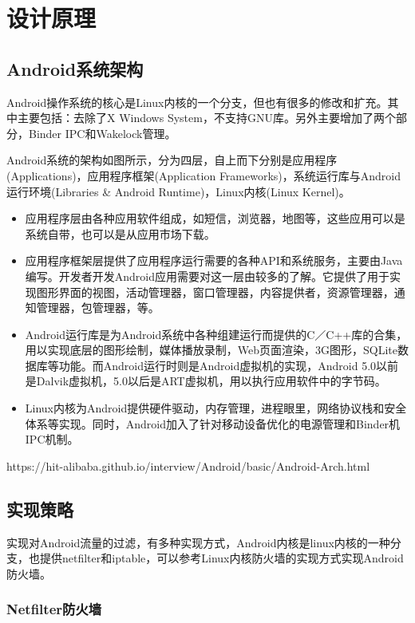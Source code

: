 \documentclass[format=final, language=chinese, degree=fyp]{hustthesis}
\begin{document}

\chapter{设计原理}\label{chapter:3}

\section{Android系统架构}

Android操作系统的核心是Linux内核的一个分支，但也有很多的修改和扩充。其中主要包括：去除了X Windows System，不支持GNU库。另外主要增加了两个部分，Binder IPC和Wakelock管理。

Android系统的架构如图所示，分为四层，自上而下分别是应用程序(Applications)，应用程序框架(Application Frameworks)，系统运行库与Android运行环境(Libraries \& Android Runtime)，Linux内核(Linux Kernel)。
\begin{itemize}
	\item 应用程序层由各种应用软件组成，如短信，浏览器，地图等，这些应用可以是系统自带，也可以是从应用市场下载。
	\item 应用程序框架层提供了应用程序运行需要的各种API和系统服务，主要由Java编写。开发者开发Android应用需要对这一层由较多的了解。它提供了用于实现图形界面的视图，活动管理器，窗口管理器，内容提供者，资源管理器，通知管理器，包管理器，等。
	\item Android运行库是为Android系统中各种组建运行而提供的C／C++库的合集，用以实现底层的图形绘制，媒体播放录制，Web页面渲染，3G图形，SQLite数据库等功能。而Android运行时则是Android虚拟机的实现，Android 5.0以前是Dalvik虚拟机，5.0以后是ART虚拟机，用以执行应用软件中的字节码。
	\item Linux内核为Android提供硬件驱动，内存管理，进程眼里，网络协议栈和安全体系等实现。同时，Android加入了针对移动设备优化的电源管理和Binder机IPC机制。
\end{itemize}
https://hit-alibaba.github.io/interview/Android/basic/Android-Arch.html

\section{实现策略}
实现对Android流量的过滤，有多种实现方式，Android内核是linux内核的一种分支，也提供netfilter和iptable，可以参考Linux内核防火墙的实现方式实现Android防火墙。

\subsection{Netfilter防火墙}
\end{document}
